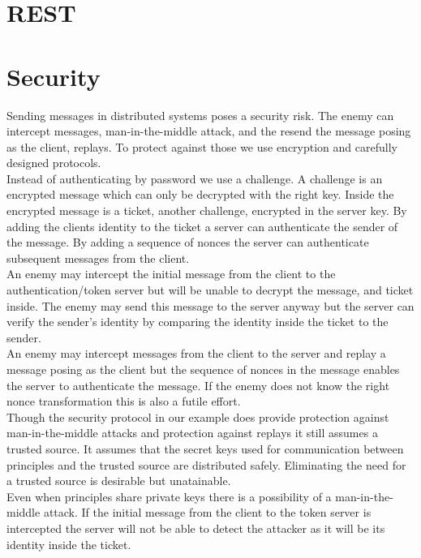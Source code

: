 \section{REST}
\section{Security}
Sending messages in distributed systems poses a security risk. The enemy can intercept messages, man-in-the-middle attack, and the resend the message posing as the client, replays. To protect against those we use encryption and carefully designed protocols. \\

Instead of authenticating by password we use a challenge. A challenge is an encrypted message which can only be decrypted with the right key. Inside the encrypted message is a ticket, another challenge, encrypted in the server key. By adding the clients identity to the ticket a server can authenticate the sender of the message. By adding a sequence of nonces the server can authenticate subsequent messages from the client.\\

An enemy may intercept the initial message from the client to the authentication/token server but will be unable to decrypt the message, and ticket inside. The enemy may send this message to the server anyway but the server can verify the sender's identity by comparing the identity inside the ticket to the sender. \\

An enemy may intercept messages from the client to the server and replay a message posing as the client but the sequence of nonces in the message enables the server to authenticate the message. If the enemy does not know the right nonce transformation this is also a futile effort.\\

Though the security protocol in our example does provide protection against man-in-the-middle attacks and protection against replays it still assumes a trusted source. It assumes that the secret keys used for communication between principles and the trusted source are distributed safely. Eliminating the need for a trusted source is desirable but unatainable. \\

Even when principles share private keys there is a possibility of a man-in-the-middle attack. If the initial message from the client to the token server is intercepted the server will not be able to detect the attacker as it will be its identity inside the ticket. \\ 

